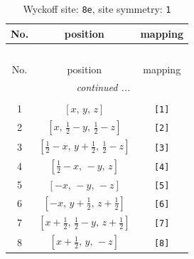 \documentclass[fleqn,8pt]{jsarticle}
\begin{document}
\renewcommand{\arraystretch}{1.2}
\begin{longtable}{ccc}
\caption{Wyckoff site: {\tt 8e}, site symmetry: {\tt 1}}
 \\
 \hline \hline
No. & position & mapping \\ \hline \endfirsthead

\multicolumn{2}{l}{\tablename\ \thetable{}} \\
 \hline \hline
No. & position & mapping \\ \hline \endhead

 \hline \hline
\multicolumn{2}{r}{\footnotesize\it continued ...} \\ \endfoot

 \hline \hline
\multicolumn{2}{r}{} \\ \endlastfoot

1 & $\left[ x,\, y,\, z \right]$ & {\tt [1]} \\ \hline
2 & $\left[ x,\, \frac{1}{2} - y,\, \frac{1}{2} - z \right]$ & {\tt [2]} \\ \hline
3 & $\left[ \frac{1}{2} - x,\, y + \frac{1}{2},\, \frac{1}{2} - z \right]$ & {\tt [3]} \\ \hline
4 & $\left[ \frac{1}{2} - x,\, - y,\, z \right]$ & {\tt [4]} \\ \hline
5 & $\left[ - x,\, - y,\, - z \right]$ & {\tt [5]} \\ \hline
6 & $\left[ - x,\, y + \frac{1}{2},\, z + \frac{1}{2} \right]$ & {\tt [6]} \\ \hline
7 & $\left[ x + \frac{1}{2},\, \frac{1}{2} - y,\, z + \frac{1}{2} \right]$ & {\tt [7]} \\ \hline
8 & $\left[ x + \frac{1}{2},\, y,\, - z \right]$ & {\tt [8]} \\
\end{longtable}
\end{document}
